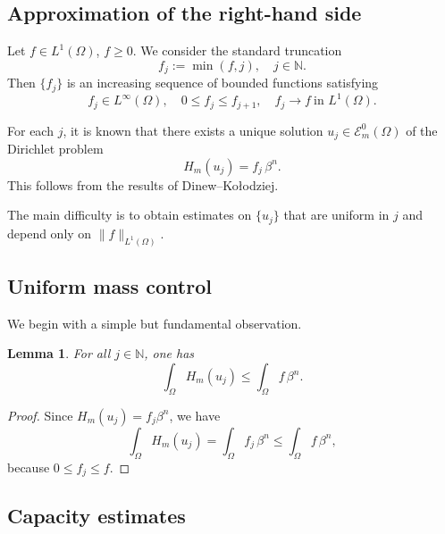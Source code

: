 \documentclass[10pt,a4paper]{amsart}
\newtheorem{lemma}[theorem]{Lemma}
\begin{document}
	
	\subsection{Approximation of the right-hand side}
	
	Let $f \in L^1(\Omega)$, $f \ge 0$.
	We consider the standard truncation
	\[
	f_j := \min(f,j), \quad j \in \mathbb{N}.
	\]
	Then $\{f_j\}$ is an increasing sequence of bounded functions satisfying
	\[
	f_j \in L^\infty(\Omega), 
	\quad
	0 \le f_j \le f_{j+1},
	\quad
	f_j \longrightarrow f \ \text{in } L^1(\Omega).
	\]
	
	For each $j$, it is known that there exists a unique solution
	$u_j \in \mathcal{E}_m^0(\Omega)$ of the Dirichlet problem
	\begin{equation}\label{eq:approx}
		H_m(u_j) = f_j \, \beta^n.
	\end{equation}
	This follows from the results of Dinew--Ko\l odziej.
	
	The main difficulty is to obtain estimates on $\{u_j\}$ that are uniform in $j$ and depend only on $\|f\|_{L^1(\Omega)}$.
	
	
	\subsection{Uniform mass control}
	
	We begin with a simple but fundamental observation.
	
	\begin{lemma}\label{lem:mass}
		For all $j \in \mathbb{N}$, one has
		\[
		\int_\Omega H_m(u_j)
		\le \int_\Omega f \, \beta^n.
		\]
	\end{lemma}
	
	\begin{proof}
		Since $H_m(u_j)=f_j\beta^n$, we have
		\[
		\int_\Omega H_m(u_j)
		=
		\int_\Omega f_j \, \beta^n
		\le
		\int_\Omega f \, \beta^n,
		\]
		because $0 \le f_j \le f$.
	\end{proof}
	

	
	
	\subsection{Capacity estimates}
	
\end{document}
